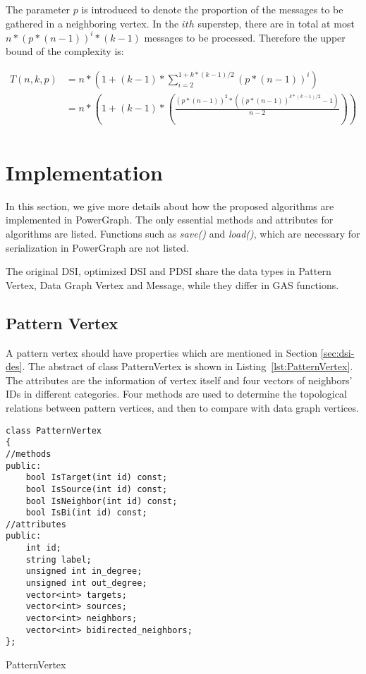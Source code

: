 The parameter $p$ is introduced to denote the proportion of the messages to be gathered in a neighboring vertex. In the $ith$ superstep, there are in total at most $n*(p*(n-1))^i*(k-1)$ messages to be processed. Therefore the upper bound of  the complexity is:

\begin{equation}\label{eq:PDSIComplexity}
	\begin{split}
		T(n,k,p) &= n*(1+(k-1)*\sum_{i=2}^{1+k*(k-1)/2} (p*(n-1))^{i})\\
		&= n*(1+(k-1)*(\frac{(p*(n-1))^2*((p*(n-1))^{k*(k-1)/2}-1)}{n-2}))\\
	\end{split}
\end{equation}

\section{Implementation}

In this section, we give more details about how the proposed algorithms are implemented in PowerGraph. The only essential methods and attributes for algorithms are listed. Functions such as \textit{save()} and \textit{load()}, which are necessary for serialization in PowerGraph are not listed.

The original DSI, optimized DSI and PDSI share the data types in Pattern Vertex, Data Graph Vertex and Message, while they differ in GAS functions.

\subsection{Pattern Vertex}

A pattern vertex should have properties which are mentioned in Section \ref{sec:dsi-des}. The abstract of class PatternVertex is shown in Listing~\ref{lst:PatternVertex}. The attributes are the information of vertex itself and four vectors of neighbors' IDs in different categories. Four methods are used to determine the topological relations between pattern vertices, and then to compare with data graph vertices.

\begin{Listing}[H]
\begin{lstlisting}
class PatternVertex
{
//methods
public:
	bool IsTarget(int id) const;
	bool IsSource(int id) const;
	bool IsNeighbor(int id) const;
	bool IsBi(int id) const;
//attributes
public:
	int id;
	string label;
	unsigned int in_degree;
	unsigned int out_degree;	
	vector<int>	targets;
	vector<int> sources;
	vector<int> neighbors;
	vector<int>	bidirected_neighbors;
};
\end{lstlisting}
\caption{PatternVertex}
\label{lst:PatternVertex}
\end{Listing}

